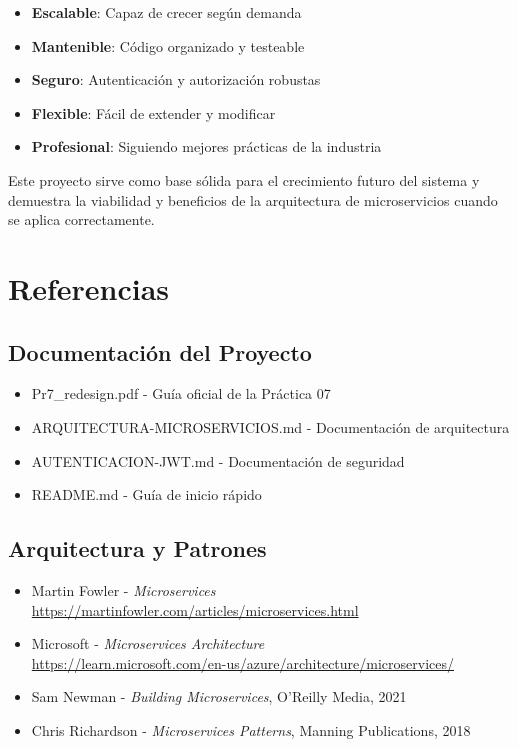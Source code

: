\documentclass[12pt,a4paper]{article}
\begin{document}
\begin{itemize}[leftmargin=*]
    \item \textbf{Escalable}: Capaz de crecer según demanda
    \item \textbf{Mantenible}: Código organizado y testeable
    \item \textbf{Seguro}: Autenticación y autorización robustas
    \item \textbf{Flexible}: Fácil de extender y modificar
    \item \textbf{Profesional}: Siguiendo mejores prácticas de la industria
\end{itemize}

Este proyecto sirve como base sólida para el crecimiento futuro del sistema y demuestra la viabilidad y beneficios de la arquitectura de microservicios cuando se aplica correctamente.

\newpage

\section{Referencias}

\subsection{Documentación del Proyecto}

\begin{itemize}[leftmargin=*]
    \item Pr7\_redesign.pdf - Guía oficial de la Práctica 07
    \item ARQUITECTURA-MICROSERVICIOS.md - Documentación de arquitectura
    \item AUTENTICACION-JWT.md - Documentación de seguridad
    \item README.md - Guía de inicio rápido
\end{itemize}

\subsection{Arquitectura y Patrones}

\begin{itemize}[leftmargin=*]
    \item Martin Fowler - \textit{Microservices} \\
    \url{https://martinfowler.com/articles/microservices.html}

    \item Microsoft - \textit{Microservices Architecture} \\
    \url{https://learn.microsoft.com/en-us/azure/architecture/microservices/}

    \item Sam Newman - \textit{Building Microservices}, O'Reilly Media, 2021

    \item Chris Richardson - \textit{Microservices Patterns}, Manning Publications, 2018
\end{itemize}
\end{document}
